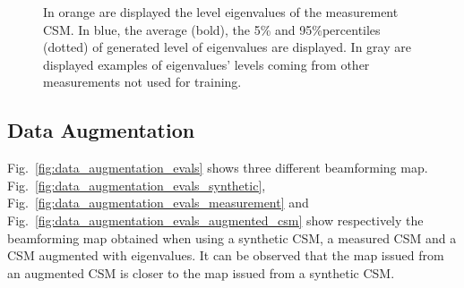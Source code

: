 \documentclass[11pt,a4paper,twoside]{report}
\begin{document}
\begin{figure}
    \centering
    \caption{In orange are displayed the level eigenvalues of the measurement CSM. In blue, the average (bold), the 5\% and 95\%percentiles (dotted) of generated level of eigenvalues are displayed. In gray are displayed examples of eigenvalues' levels coming from other measurements not used for training.}
    \label{fig:outliers_evals_dB_wgangp}    
\end{figure}

\subsection{Data Augmentation}

Fig.~\ref{fig:data_augmentation_evals} shows three different beamforming map. Fig.~\ref{fig:data_augmentation_evals_synthetic}, Fig.~\ref{fig:data_augmentation_evals_measurement} and Fig.~\ref{fig:data_augmentation_evals_augmented_csm} show respectively the beamforming map obtained when using a synthetic CSM, a measured CSM and a CSM augmented with eigenvalues. It can be observed that the map issued from an augmented CSM is closer to the map issued from a synthetic CSM.
\end{document}
